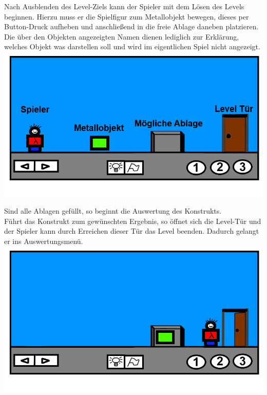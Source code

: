 \documentclass{scrartcl}
\begin{document}
\begin{description}
\begin{enumerate}
		\begin{minipage}{1\textwidth}
			\item \label{Levelaufbau:ErsteSchritte} Nach Ausblenden des Level-Ziels kann der Spieler mit dem Lösen des Levels beginnen. Hierzu muss er die Spielfigur zum Metallobjekt bewegen, dieses per Button-Druck aufheben und anschließend in die freie Ablage daneben platzieren.\\
			Die über den Objekten angezeigten Namen dienen lediglich zur Erklärung, welches Objekt was darstellen soll und wird im eigentlichen Spiel nicht angezeigt.\\
			\includegraphics[scale=0.5]{assets/Level1mA}
		\end{minipage}
		
		\begin{minipage}{1\textwidth}
			\item \label{Levelaufbau:Levelende} Sind alle Ablagen gefüllt, so beginnt die Auswertung des Konstrukts.\\ Führt das Konstrukt zum gewünschten Ergebnis, so öffnet sich die Level-Tür  und der Spieler kann durch Erreichen dieser Tür das Level beenden. Dadurch gelangt er ins Auswertungsmenü.\\
			\includegraphics[scale=0.5]{assets/LevelEnde}
		\end{minipage}
		

\end{enumerate}
\end{description}
\end{document}
